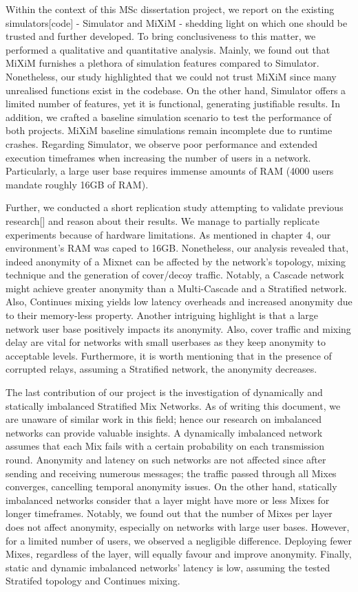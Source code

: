 \documentclass[logo,msc,cyber]{infthesis}   %
\begin{document}
Within the context of this MSc dissertation project, we report on the existing
simulators[code] - Simulator and MiXiM - shedding light on which one should be
trusted and further developed. To bring conclusiveness to this matter, we
performed a qualitative and quantitative analysis. Mainly, we found out that
MiXiM furnishes a plethora of simulation features compared to Simulator.
Nonetheless, our study highlighted that we could not trust MiXiM since many
unrealised functions exist in the codebase. On the other hand, Simulator offers
a limited number of features, yet it is functional, generating justifiable
results. In addition, we crafted a baseline simulation scenario to test the
performance of both projects. MiXiM baseline simulations remain incomplete due
to runtime crashes. Regarding Simulator, we observe poor performance and
extended execution timeframes when increasing the number of users in a network.
Particularly, a large user base requires immense amounts of RAM (4000 users
mandate roughly 16GB of RAM).

Further, we conducted a short replication study attempting to validate previous
research[] and reason about their results. We manage to partially replicate
experiments because of hardware limitations. As mentioned in chapter 4, our
environment's RAM was caped to 16GB. Nonetheless, our analysis revealed that,
indeed anonymity of a Mixnet can be affected by the network's topology, mixing
technique and the generation of cover/decoy traffic. Notably, a Cascade network
might achieve greater anonymity than a Multi-Cascade and a Stratified network.
Also, Continues mixing yields low latency overheads and increased anonymity due
to their memory-less property. Another intriguing highlight is that a large
network user base positively impacts its anonymity. Also, cover traffic and
mixing delay are vital for networks with small userbases as they keep anonymity
to acceptable levels. Furthermore, it is worth mentioning that in the presence
of corrupted relays, assuming a Stratified network, the anonymity decreases. 

The last contribution of our project is the investigation of dynamically and
statically imbalanced Stratified Mix Networks. As of writing this document, we
are unaware of similar work in this field; hence our research on imbalanced
networks can provide valuable insights. A dynamically imbalanced network assumes
that each Mix fails with a certain probability on each transmission round.
Anonymity and latency on such networks are not affected since after sending and
receiving numerous messages; the traffic passed through all Mixes converges,
cancelling temporal anonymity issues. On the other hand, statically imbalanced
networks consider that a layer might have more or less Mixes for longer
timeframes. Notably, we found out that the number of Mixes per layer does not
affect anonymity, especially on networks with large user bases. However, for a
limited number of users, we observed a negligible difference. Deploying fewer
Mixes, regardless of the layer, will equally favour and improve anonymity.
Finally, static and dynamic imbalanced networks' latency is low, assuming the
tested Stratifed topology and Continues mixing.
\end{document}
